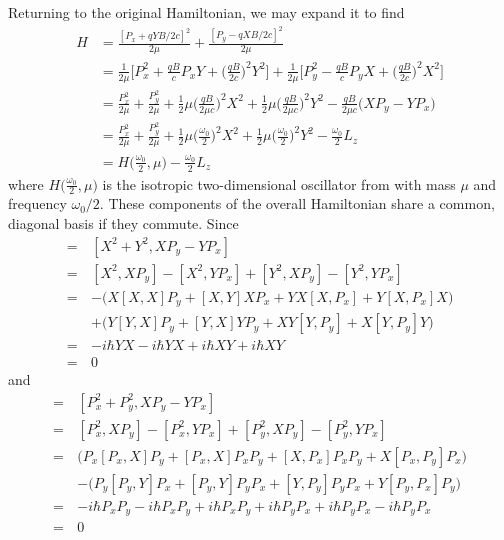\documentclass[../principles-of-quantum-mechanics.tex]{subfiles}
\begin{document}
\begin{questions}
\begin{solution}
		Returning to the original Hamiltonian, we may expand it to find
		\begin{align*}
			H &= \frac{[P_x + qYB/2c]^2}{2\mu} + \frac{[P_y - qXB/2c]^2}{2\mu} \\
			&= \frac{1}{2\mu}\Big[P_x^2 + \frac{qB}{c}P_xY + \Big(\frac{qB}{2c}\Big)^2Y^2\Big] + \frac{1}{2\mu}\Big[P_y^2 - \frac{qB}{c}P_yX + \Big(\frac{qB}{2c}\Big)^2X^2\Big] \\
			&= \frac{P_x^2}{2\mu} + \frac{P_y^2}{2\mu} + \frac{1}{2}\mu\Big(\frac{qB}{2\mu c}\Big)^2X^2 + \frac{1}{2}\mu\Big(\frac{qB}{2\mu c}\Big)^2Y^2 - \frac{qB}{2\mu c}\Big(XP_y - YP_x\Big) \\
			&= \frac{P_x^2}{2\mu} + \frac{P_y^2}{2\mu} + \frac{1}{2}\mu\Big(\frac{\omega_0}{2}\Big)^2X^2 + \frac{1}{2}\mu\Big(\frac{\omega_0}{2}\Big)^2Y^2 - \frac{\omega_0}{2}L_z \\
			&= H\Big(\frac{\omega_0}{2}, \mu\Big) - \frac{\omega_0}{2}L_z
		\end{align*}
		where $H\big(\frac{\omega_0}{2}, \mu\big)$ is the isotropic two-dimensional oscillator from with mass $\mu$ and frequency $\omega_0/2$. These components of the overall Hamiltonian share a common, diagonal basis if they commute. Since
		\begin{align*}
			[X^2 + Y^2, L_z] =\,&[X^2 + Y^2, XP_y - YP_x] \\
			=\,&[X^2, XP_y] - [X^2, YP_x] + [Y^2, XP_y] - [Y^2, YP_x] \\
			=\,&-{\Big(X[X, X]P_y + [X, Y]XP_x + YX[X, P_x] + Y[X, P_x]X\Big)} \\
			&+\Big(Y[Y, X]P_y + [Y, X]YP_y + XY[Y, P_y] + X[Y, P_y]Y\Big) \\
			=\,&-i\hbar YX - i\hbar YX + i\hbar XY + i\hbar XY \\
			=\,&0
		\end{align*}
		and
		\begin{align*}
			[P_x^2 + P_y^2, L_z] =\,&[P_x^2 + P_y^2, XP_y - YP_x] \\
			=\,&[P_x^2, XP_y] - [P_x^2, YP_x] + [P_y^2, XP_y] - [P_y^2, YP_x] \\
			=\,&\Big(P_x[P_x, X]P_y + [P_x, X]P_xP_y + [X, P_x]P_xP_y + X[P_x, P_y]P_x\Big) \\
			&{-\Big(P_y[P_y, Y]P_x + [P_y, Y]P_yP_x + [Y, P_y]P_yP_x + Y[P_y, P_x]P_y\Big)} \\
			=\,&-i\hbar P_xP_y - i\hbar P_xP_y + i\hbar P_xP_y + i\hbar P_yP_x + i\hbar P_yP_x - i\hbar P_yP_x \\
			=\,&0
		\end{align*}

\end{solution}
\end{questions}
\end{document}
